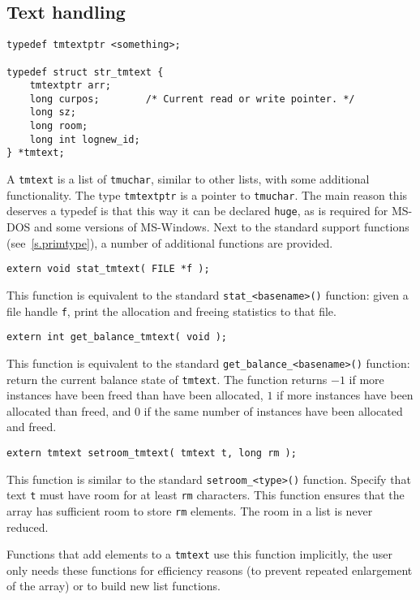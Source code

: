 \subsection{Text handling}
\label{s.tmtext}
\begin{verbatim}
typedef tmtextptr <something>;

typedef struct str_tmtext {
    tmtextptr arr;
    long curpos;        /* Current read or write pointer. */
    long sz;
    long room;
    long int lognew_id;
} *tmtext;
\end{verbatim}
\par
A \verb'tmtext' is a list of \verb'tmuchar', similar to other
lists, with some additional functionality. The type \verb'tmtextptr' is a
pointer to \verb'tmuchar'.
The main reason this deserves a typedef is that this way it can be declared
\verb'huge', as is required for MS-DOS and some versions of MS-Windows.
Next to the standard support functions (see~\ref{s.primtype}),
a number of additional functions are provided.
\begin{verbatim}
extern void stat_tmtext( FILE *f );
\end{verbatim}
\begin{desc}
This function is equivalent to the standard \verb'stat_<basename>()' function:
given a file handle \verb'f', print the allocation and freeing statistics
to that file.
\end{desc}
\begin{verbatim}
extern int get_balance_tmtext( void );
\end{verbatim}
\begin{desc}
This function is equivalent to the standard \verb'get_balance_<basename>()'
function: return the current balance state of \verb'tmtext'. 
The function returns $-1$ if more instances have been freed than have
been allocated, $1$ if more instances have been allocated than freed,
and $0$ if the same number of instances have been allocated and freed.
\end{desc}
\begin{verbatim}
extern tmtext setroom_tmtext( tmtext t, long rm );
\end{verbatim}
\begin{desc}
This function is similar to the standard \verb'setroom_<type>()'
function.
Specify that text \texttt{t} must have room for at least \texttt{rm} characters.
This function ensures that the array has sufficient room to
store \texttt{rm} elements.
The room in a list is never reduced.
\par
Functions that add elements to a \verb'tmtext' use this function implicitly,
the user only needs these functions for efficiency reasons
(to prevent repeated enlargement of the array)
or to build new list functions.
\end{desc}
